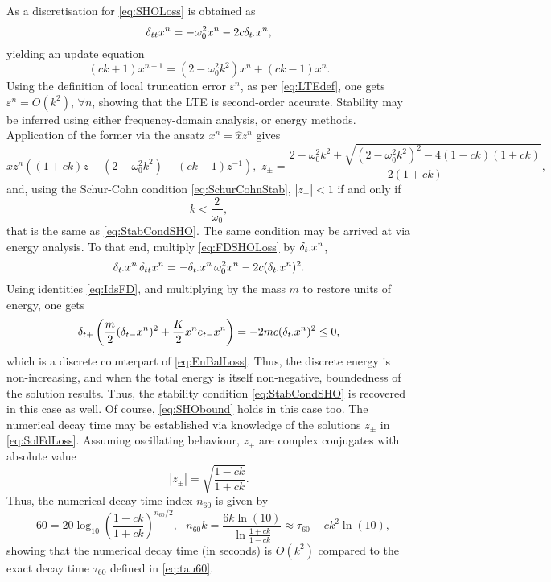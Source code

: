 As a discretisation for \eqref{eq:SHOLoss} is obtained as
\begin{equation}\label{eq:FDSHOLoss}
    \delta_{tt} x^n = -\omega_0^2 x^n -2c \delta_{t\cdot} x^n,
\end{equation}
yielding an update equation
\begin{equation}
    \left(ck+1\right) x^{n+1} = (2-\omega_0^2 k^2) x^n + (ck - 1)x^n.
\end{equation}
Using the definition of local truncation error $\varepsilon^n$, as per \eqref{eq:LTEdef}, one gets $\varepsilon^n = O(k^2)$, $\forall n$, showing that the LTE is second-order accurate. Stability may be inferred using either frequency-domain analysis, or energy methods. Application of the former via the ansatz $x^n = \hat x z^n$ gives
\begin{equation}\label{eq:SolFdLoss}
    \hat x z^n \left((1+ck)z - (2-\omega_0^2 k^2) -(ck-1)z^{-1}\right), \,\, z_\pm = \frac{2-\omega_0^2k^2 \pm \sqrt{(2-\omega_0^2k^2)^2 - 4(1-ck)(1+ck)}}{2(1+ck)},
\end{equation}
and, using the Schur-Cohn condition \eqref{eq:SchurCohnStab}, $|z_\pm|<1$ if and only if
\begin{equation}
    k < \frac{2}{\omega_0},
\end{equation}
that is the same as \eqref{eq:StabCondSHO}. The same condition may be arrived at via energy analysis. To that end, multiply \eqref{eq:FDSHOLoss} by $\delta_{t\cdot} x^n$, 
\begin{equation}
    \delta_{t\cdot} x^n \, \delta_{tt} x^n = - \delta_{t\cdot} x^n \, \omega_0^2 x^n - 2c (\delta_{t\cdot} x^n)^2.
\end{equation}
Using identities \eqref{eq:IdsFD}, and multiplying by the mass $m$ to restore units of energy, one gets
\begin{equation}
    \delta_{t+} \left( \frac{m}{2}{(\delta_{t-} x^n)^2} + \frac{K}{2} {x^n e_{t-} x^n} \right) = - 2mc (\delta_{t\cdot} x^n)^2 \leq 0,
\end{equation}
which is a discrete counterpart of \eqref{eq:EnBalLoss}. Thus, the discrete energy is non-increasing, and when the total energy is itself non-negative, boundedness of the solution results. Thus, the stability condition \eqref{eq:StabCondSHO} is recovered in this case as well. Of course, \eqref{eq:SHObound}  holds in this case too. The numerical decay time may be established via knowledge of the solutions $z_\pm$ in \eqref{eq:SolFdLoss}. Assuming oscillating behaviour, $z_\pm$ are complex conjugates with absolute value
\begin{equation}
    |z_\pm| = \sqrt{\frac{1-ck}{1+ck}}.
\end{equation}
Thus, the numerical decay time index $n_{60}$ is given by
\begin{equation}
    -60 = 20\log_{10}\left({\frac{1-ck}{1+ck}}\right)^{n_{60}/2},\,\,\,\, n_{60}k = \frac{6k \ln(10)}{\ln \frac{1+ck}{1-ck}}\approx \tau_{60} - c k^2 \ln(10),
\end{equation}
showing that the numerical decay time (in seconds) is $O(k^2)$ compared to the exact decay time $\tau_{60}$ defined in \eqref{eq:tau60}.


